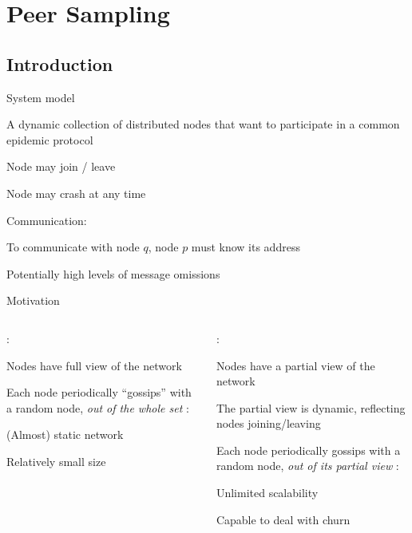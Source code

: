 \section{Peer Sampling}

\subsection{Introduction}

\begin{frame}{System model}

\transdissolve

\BIL
\item A dynamic collection of distributed nodes that want to participate in a common epidemic protocol
\BI
\item Node may join / leave
\item Node may crash at any time
\EI
\item Communication:
\BI
\item To communicate with node $q$, node $p$ must know its address
\item Potentially high levels of message omissions
\EI
\EIL

\end{frame}

\begin{frame}{Motivation}

\begin{columns}
\begin{column}{0.5\textwidth}
	
:\\
\BI
\item Nodes have \alert{full view} of the network
\item Each node periodically “gossips” with a random node, \textit{out of the whole set}
\EI
\bigskip
{}:\\
\BI
\item (Almost) static network
\item Relatively small size 
\EI
\end{column}
\pause
\begin{column}{0.5\textwidth}
:\\
\BI
\item Nodes have a \alert{partial view} of the network
\item The partial view is \alert{dynamic}, reflecting nodes joining/leaving
\item Each node periodically gossips with a random node, \textit{out of its partial view}
\EI
\bigskip
{}:\\
\BI
\item Unlimited scalability
\item Capable to deal with churn
\EI
\end{column}
\end{columns}

\end{frame}
	

